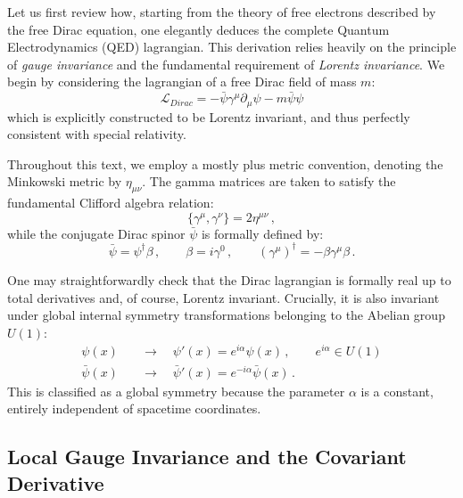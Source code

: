 Let us first review how, starting from the theory of free electrons described by the free Dirac equation, one elegantly deduces the complete Quantum Electrodynamics (QED) lagrangian. This derivation relies heavily on the principle of \textit{gauge invariance} and the fundamental requirement of \textit{Lorentz invariance}. We begin by considering the lagrangian of a free Dirac field of mass \(m\):
\begin{equation} \label{eq:dirac_free}
    \mathcal{L}_{Dirac} = -\bar{\psi}\gamma^\mu\partial_\mu\psi - m\bar{\psi}\psi
\end{equation}
which is explicitly constructed to be Lorentz invariant, and thus perfectly consistent with special relativity.

Throughout this text, we employ a mostly plus metric convention, denoting the Minkowski metric by \(\eta_{\mu\nu}\). The gamma matrices are taken to satisfy the fundamental Clifford algebra relation:
\begin{equation} \label{eq:clifford}
    \{\gamma^\mu, \gamma^\nu\} = 2\eta^{\mu\nu} \, ,
\end{equation}
while the conjugate Dirac spinor \(\bar{\psi}\) is formally defined by:
\begin{equation} \label{eq:conjugate_spinor}
    \bar{\psi} = \psi^\dagger\beta \, , \qquad \beta = i\gamma^0 \, , \qquad (\gamma^\mu)^\dagger = -\beta\gamma^\mu\beta \, .
\end{equation}

One may straightforwardly check that the Dirac lagrangian is formally real up to total derivatives and, of course, Lorentz invariant. Crucially, it is also invariant under global internal symmetry transformations belonging to the Abelian group \(U(1)\):
\begin{equation} \label{eq:global_u1}
    \begin{aligned}
        \psi(x) \quad       & \rightarrow \quad \psi'(x) = e^{i\alpha}\psi(x) \, , \qquad e^{i\alpha} \in U(1) \\
        \bar{\psi}(x) \quad & \rightarrow \quad \bar{\psi}'(x) = e^{-i\alpha}\bar{\psi}(x) \, .
    \end{aligned}
\end{equation}
This is classified as a global symmetry because the parameter \(\alpha\) is a constant, entirely independent of spacetime coordinates.

\subsection{Local Gauge Invariance and the Covariant Derivative}

